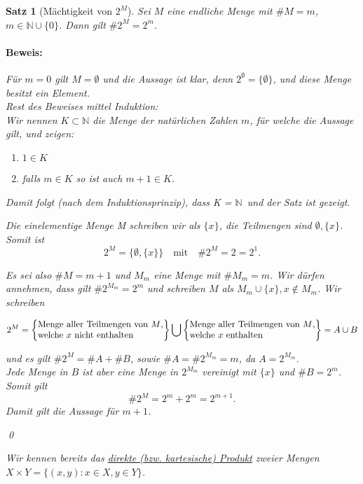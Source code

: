 \documentclass{report}
\newcommand{\N}{\mathbb{N}}
\newcommand{\mN}{\(\mathbb{N}\)}
\theoremstyle{customrem}
\theoremstyle{customdef}
\newtheorem{satz}[definition]{Satz}
\renewenvironment{proof}{\paragraph{Beweis: }}{\qed}
\theoremstyle{customenv}
\begin{document}
	\begin{satz}[Mächtigkeit von $2^M$]
		Sei \(M\) eine endliche Menge mit \(\#M = m\), \(m \in \N \cup \{0\}\). Dann gilt \(\#2^M = 2^m\).
		
		\begin{proof}
			Für \(m = 0\) gilt \(M = \emptyset\) und die Aussage ist klar, denn \(2^\emptyset = \{\emptyset\}\), und diese Menge besitzt ein Element.\\
			Rest des Beweises mittel Induktion:\\
			Wir nennen \(K \subset \N\) die Menge der natürlichen Zahlen \(m\), für welche die Aussage gilt, und zeigen:
			\begin{enumerate}
				\itemsep0cm
				\item \(1 \in K\)
				\item falls \(m \in K\) so ist auch \(m + 1 \in K\).
			\end{enumerate}
			Damit folgt (nach dem Induktionsprinzip), dass  K = \mN\ und der Satz ist gezeigt.\\
			\begin{description}[labelindent = 12pt, labelwidth = 1.0cm, leftmargin = 1.0cm]
				\item[Zu 1.:] Die einelementige Menge M schreiben wir als \(\{x\}\), die Teilmengen sind \(\emptyset, \{x\}\). Somit ist \[2^M = \{\emptyset, \{x\}\}\quad\text{mit}\quad\#2^M = 2 = 2^1.\]
				\item[Zu 2.:] Es sei also \(\#M = m + 1\)  und \(M_m\) eine Menge mit \(\# M_m = m\). Wir dürfen annehmen, dass gilt \(\#2^{M_m} = 2^m\) und schreiben \(M\) als \(M_m \cup \{x\}, x \not\in M_m\). Wir schreiben
				
				\[2^M = \left\{\begin{matrix}\text{Menge aller Teilmengen von $M$,}\\\text{welche $x$ nicht enthalten}\hfill\end{matrix}\right\} \bigcup \left\{\begin{matrix}\text{Menge aller Teilmengen von $M$,}\\\text{welche $x$ enthalten}\hfill\end{matrix}\right\} = A \cup B\]
				
				und es gilt \(\#2^M = \#A + \#B\), sowie \(\#A = \#2^{M_m} = m\), da \(A = 2^{M_m}\).\\
				
				Jede Menge in \(B\) ist aber eine Menge in \(2^{M_m}\) vereinigt mit \(\{x\}\) und \(\#B = 2^m\). Somit gilt \[\#2^M = 2^m + 2^m = 2^{m + 1}.\]
				Damit gilt die Aussage für \(m + 1\).
			\end{description}
		\end{proof}
		
		Wir kennen bereits das \hyperref[defmengenoperationen]{direkte (bzw. kartesische) Produkt} zweier Mengen \(X \times Y = \{(x, y) : x\in X, y \in Y\}\).
	\end{satz}
	
\end{document}
